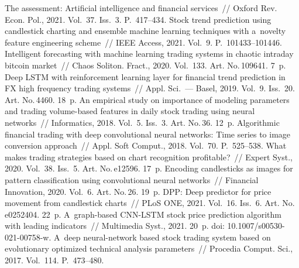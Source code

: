 {   \begin{multicols}{2}
   


  
{\small\frenchspacing
 {%
 \begin{thebibliography}{99}
 The assessment: Artificial intelligence and financial services~// 
Oxford Rev. Econ. Pol., 2021. Vol.~37. Iss.~3. P.~417--434.
 Stock trend prediction using candlestick charting and 
ensemble machine learning techniques with a~novelty feature engineering scheme~// IEEE 
Access, 2021. Vol.~9. P.~101433--101446.
 Intelligent forecasting with machine learning trading systems in chaotic 
intraday bitcoin market~// Chaos Soliton. Fract., 2020. Vol.~133. Art. No.\,109641. 7~p.
 Deep LSTM with reinforcement learning layer for financial trend prediction in FX 
high frequency trading systems~// Appl. Sci.~--- Basel, 2019. Vol.~9. Iss.~20. Art. No.\,4460. 18~p.
 An empirical study on importance of modeling parameters and 
trading volume-based features in daily stock trading using neural networks~// Informatics, 
2018. Vol.~5. Iss.~3. Art. No.\,36. 12~p.
 Algorithmic financial trading with deep convolutional 
neural networks: Time series to image conversion approach~// Appl. Soft Comput., 2018. 
Vol.~70. P.~525--538.
 What makes trading strategies based on chart recognition 
profitable?~// Expert Syst., 2020. Vol.~38. Iss.~5. Art. No.\,e12596. 17~p.
 Encoding candlesticks as images for pattern classification using 
convolutional neural networks~// Financial Innovation, 2020. Vol.~6. Art. No.\,26. 19~p.
 DPP: Deep predictor for price movement from candlestick charts~// 
PLoS ONE, 2021. Vol.~16. Iss.~6. Art. No.\,e0252404. 22~p.
 A~graph-based CNN-LSTM stock 
price prediction algorithm with leading indicators~// Multimedia Syst., 2021. 20~p. doi: 
10.1007/s00530-021-00758-w.
 A~deep neural-network based stock trading 
system based on evolutionary optimized technical analysis parameters~// Procedia Comput. 
Sci., 2017. Vol.~114. P.~473--480.

\end{thebibliography}}}
\end{multicols}}
